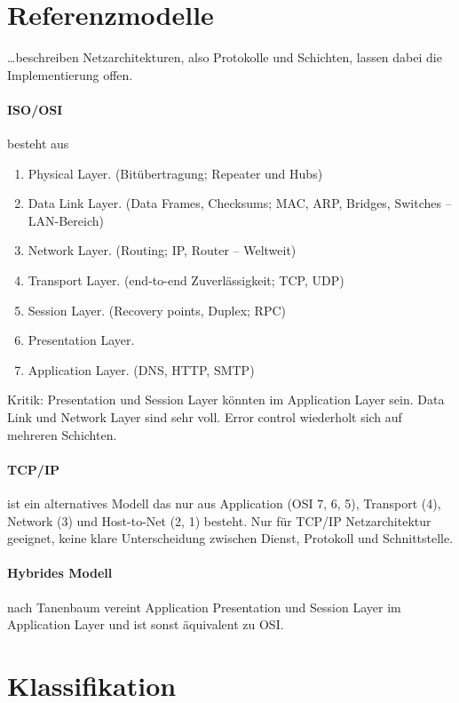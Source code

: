 \documentclass{article}
\begin{document}
\begin{multicols}{1}

\section*{Referenzmodelle}

\ldots beschreiben Netzarchitekturen, also Protokolle und Schichten, lassen dabei die Implementierung offen.

\paragraph{ISO/OSI} besteht aus

\begin{enumerate}
    \item Physical Layer. (Bitübertragung; Repeater und Hubs)
    \item Data Link Layer. (Data Frames, Checksums; MAC, ARP, Bridges, Switches -- LAN-Bereich)
    \item Network Layer. (Routing; IP, Router -- Weltweit)
    \item Transport Layer. (end-to-end Zuver\-lässig\-keit; TCP, UDP)
    \item Session Layer. (Recovery points, Duplex; RPC)
    \item Presentation Layer.
    \item Application Layer. (DNS, HTTP, SMTP)
\end{enumerate}

Kritik: Presentation und Session Layer könnten im Application Layer sein. Data Link und Network Layer sind sehr voll. Error control wiederholt sich auf mehreren Schichten.

\paragraph{TCP/IP} ist ein alternatives Modell das nur aus Application (OSI 7, 6, 5), Transport (4), Network (3) und Host-to-Net (2, 1) besteht. Nur für TCP/IP Netzarchitektur geeignet, keine klare Unterscheidung zwischen Dienst, Protokoll und Schnittstelle.

\paragraph{Hybrides Modell} nach Tanenbaum vereint Application Presentation und Session Layer im Application Layer und ist sonst äquivalent zu OSI.

\section*{Klassifikation}


\end{multicols}
\end{document}
